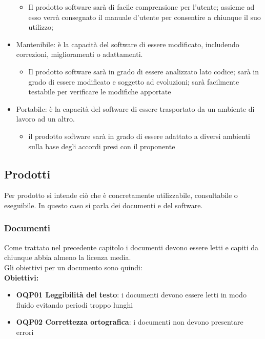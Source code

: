 \documentclass[../piano_di_qualifica.tex]{subfiles}
\begin{document}
\begin{itemize}
\begin{itemize}
		      \item Il prodotto software sarà di facile comprensione per l’utente; assieme ad esso verrà consegnato il manuale d’utente per consentire a chiunque il suo utilizzo;
	      \end{itemize}
	\item Mantenibile: è la capacità del software di essere modificato, includendo correzioni, miglioramenti o adattamenti.
	      \begin{itemize}
		      \item Il prodotto software sarà in grado di essere analizzato lato codice; sarà in grado di essere modificato e soggetto ad evoluzioni; sarà facilmente testabile per verificare le modifiche apportate
	      \end{itemize}
	\item Portabile: è la capacità del software di essere trasportato da un ambiente di lavoro ad un altro.
	      \begin{itemize}
		      \item il prodotto software sarà in grado di essere adattato a diversi ambienti sulla base degli accordi presi con il proponente
	      \end{itemize}
\end{itemize}

\subsection{Prodotti}
Per prodotto si intende ciò che è concretamente utilizzabile, consultabile o eseguibile. In questo caso si parla dei documenti e del software.

\subsubsection{Documenti}
Come trattato nel precedente capitolo i documenti devono essere letti e capiti da chiunque abbia almeno la licenza media.\\
Gli obiettivi per un documento sono quindi: \\

\setlength{\parindent}{0pt}\textbf{Obiettivi:}
\smallbreak
\begin{itemize}
	\item \textbf{OQP01 Leggibilità del testo}: i documenti devono essere letti in modo fluido evitando periodi troppo lunghi \\
	\item \textbf{OQP02 Correttezza ortografica}: i documenti non devono presentare errori
\end{itemize}
\end{document}
